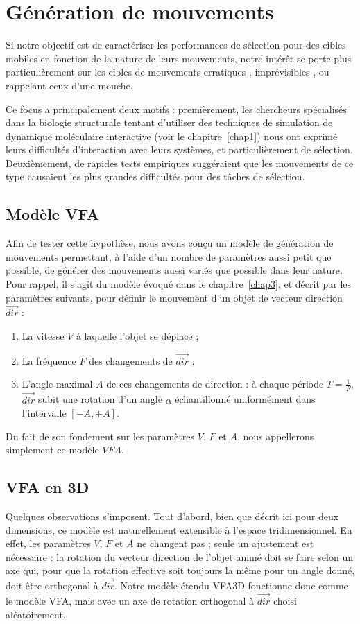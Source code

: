 \section{Génération de mouvements}
	Si notre objectif est de caractériser les performances de sélection pour des cibles mobiles en fonction de la nature de leurs mouvements, notre intérêt se porte plus particulièrement sur les cibles de mouvements \og erratiques \fg{}, \og imprévisibles \fg{}, ou rappelant ceux d'une mouche.
	
	Ce focus a principalement deux motifs : premièrement, les chercheurs spécialisés dans la biologie structurale tentant d'utiliser des techniques de simulation de dynamique moléculaire interactive (voir le chapitre~\ref{chap1}) nous ont exprimé leurs difficultés d'interaction avec leurs systèmes, et particulièrement de sélection. Deuxièmement, de rapides tests empiriques suggéraient que les mouvements de ce type causaient les plus grandes difficultés pour des tâches de sélection.
	
	\subsection{Modèle VFA}
	Afin de tester cette hypothèse, nous avons conçu un modèle de génération de mouvements permettant, à l'aide d'un nombre de paramètres aussi petit que possible, de générer des mouvements aussi variés que possible dans leur nature. Pour rappel, il s'agit du modèle évoqué dans le chapitre~\ref{chap3}, et décrit par les paramètres suivants, pour définir le mouvement d'un objet de vecteur direction $\vec{dir}$ :
	
    \begin{enumerate}
    	\item La vitesse $V$ à laquelle l'objet se déplace ;
    	\item La fréquence $F$ des changements de $\vec{dir}$ ;
    	\item L'angle maximal $A$ de ces changements de direction : à chaque période $T = \frac{1}{F}$, $\vec{dir}$ subit une rotation d'un angle $\alpha$ échantillonné uniformément dans l'intervalle $[-A, +A]$.
    \end{enumerate}
    
    Du fait de son fondement sur les paramètres $V$, $F$ et $A$, nous appellerons simplement ce modèle $VFA$.
    
    \subsection{VFA en 3D}
    Quelques observations s'imposent. Tout d'abord, bien que décrit ici pour deux dimensions, ce modèle est naturellement extensible à l'espace tridimensionnel. En effet, les paramètres $V$, $F$ et $A$ ne changent pas ; seule un ajustement est nécessaire : la rotation du vecteur direction de l'objet animé doit se faire selon un axe qui, pour que la rotation effective soit toujours la même pour un angle donné, doit être orthogonal à $\vec{dir}$. Notre modèle étendu VFA3D fonctionne donc comme le modèle VFA, mais avec un axe de rotation orthogonal à $\vec{dir}$ choisi aléatoirement.
    
